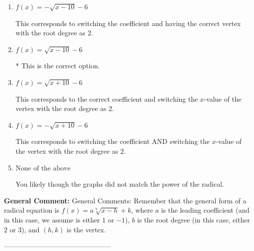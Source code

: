 \documentclass{extbook}[14pt]
\begin{document}
\begin{enumerate}[label=\Alph*.] 
\item $ f(x) = - \sqrt{x - 10} - 6 $ 

 This corresponds to switching the coefficient and having the correct vertex with the root degree as $2$. 
\item $ f(x) = \sqrt{x - 10} - 6 $ 

 * This is the correct option. 
\item $ f(x) = \sqrt{x + 10} - 6 $ 

 This corresponds to the correct coefficient and switching the $x$-value of the vertex with the root degree as $2$. 
\item $ f(x) = - \sqrt{x + 10} - 6 $ 

 This corresponds to switching the coefficient AND switching the $x$-value of the vertex with the root degree as $2$. 
\item $ \text{None of the above} $ 

 You likely though the graphs did not match the power of the radical. 
\end{enumerate} 
 
\textbf{General Comment:} General Comments: Remember that the general form of a radical equation is $ f(x) = a \sqrt[b]{x - h} + k$, where $a$ is the leading coefficient (and in this case, we assume is either $1$ or $-1$), $b$ is the root degree (in this case, either $2$ or $3$), and $(h, k)$ is the vertex. 

-----------------------------------------------
\end{document}
